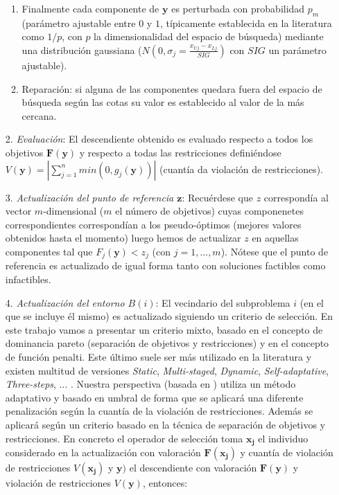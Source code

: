 \begin{enumerate}
\begin{enumerate}
        \item Finalmente cada componente de $\boldsymbol{y}$ es perturbada con probabilidad $p_m$ (parámetro ajustable entre $0$ y $1$, típicamente establecida en la literatura como $1/p$, con $p$ la dimensionalidad del espacio de búsqueda) mediante una distribución gaussiana ($N(0,\sigma_{j} = \frac{x_{Uj} - x_{Lj}}{SIG})$ con $SIG$ un parámetro ajustable).\\
        
        \item Reparación: si alguna de las componentes quedara fuera del espacio de búsqueda según las cotas su valor es establecido al valor de la más cercana.\\
    \end{enumerate}

    \item[2.] \textit{Evaluación}: El descendiente obtenido es evaluado respecto a todos los objetivos $\boldsymbol{F}(\boldsymbol{y})$ y respecto a todas las restricciones definiéndose $V(\boldsymbol{y}) = \left\vert \sum \limits_{j=1}^{n} min(0, g_j(\boldsymbol{y})) \right\vert$ (cuantía da violación de restricciones).\\
    
    \item[3.] \textit{Actualización del punto de referencia $\boldsymbol{z}$}: Recuérdese que $z$ correspondía al vector $m$-dimensional ($m$ el número de objetivos) cuyas componenetes correspondientes correspondían a los pseudo-óptimos (mejores valores obtenidos hasta el momento) luego hemos de actualizar $z$ en aquellas componentes tal que $F_j(\boldsymbol{y}) < z_j$ (con $j=1,\dots,m$). Nótese que el punto de referencia es actualizado de igual forma tanto con soluciones factibles como infactibles.\\
    
    \item[4.] \textit{Actualización del entorno $B(i)$}: El vecindario del subproblema $i$ (en el que se incluye él mismo) es actualizado siguiendo un criterio de selección. En este trabajo vamos a presentar un criterio mixto, basado en el concepto de dominancia pareto (separación de objetivos y restricciones) y en el concepto de función penalti. Este último suele ser más utilizado en la literatura y existen multitud de versiones \textit{Static}, \textit{Multi-staged}, \textit{Dynamic}, \textit{Self-adaptative}, \textit{Three-steps}, ... \cite{Vaz}. Nuestra perspectiva (basada en \cite{Fan2017,Asafuddoula2012,Yang2020,Jan2010,Zhu2019}) utiliza un método adaptativo y basado en umbral de forma que se aplicará una diferente penalización según la cuantía de la violación de restricciones. Además se aplicará según un criterio basado en la técnica de separación de objetivos y restricciones. En concreto el operador de selección toma $\boldsymbol{x_j}$ el individuo considerado en la actualización con valoración $\boldsymbol{F}(\boldsymbol{x_j})$ y cuantía de violación de restricciones $V(\boldsymbol{x_j})$ y $\boldsymbol{y})$ el descendiente con valoración $\boldsymbol{F}(\boldsymbol{y})$ y violación de restricciones $V(\boldsymbol{y})$, entonces:\\
    

\end{enumerate}
